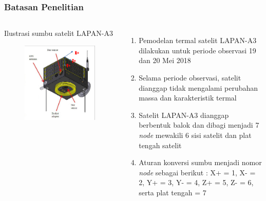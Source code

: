 \documentclass[8pt]{beamer}
\begin{document}
\begin{frame}
  \frametitle{Batasan Penelitian}
  \begin{columns}[T]
            \begin{block}{\center Ilustrasi sumbu satelit LAPAN-A3}
      \begin{figure}
          \includegraphics[width=1.0\textwidth]{figure/a3axis2.png}
      \end{figure}
            \end{block}
  \begin{enumerate}
    \item Pemodelan termal satelit LAPAN-A3 dilakukan untuk periode observasi 19 dan 20 Mei 2018
    \item Selama periode observasi, satelit dianggap tidak mengalami perubahan massa dan karakteristik termal
    \item Satelit LAPAN-A3 dianggap berbentuk balok dan dibagi menjadi 7
	\textit{node} mewakili 6 sisi satelit dan plat tengah satelit
    \item Aturan konversi sumbu menjadi nomor \textit{node} sebagai berikut : X+ = 1, X- = 2, Y+ = 3, Y- = 4, Z+ = 5, Z- = 6, serta plat tengah = 7
  \end{enumerate}
  \end{columns}
\end{frame}
\end{document}
